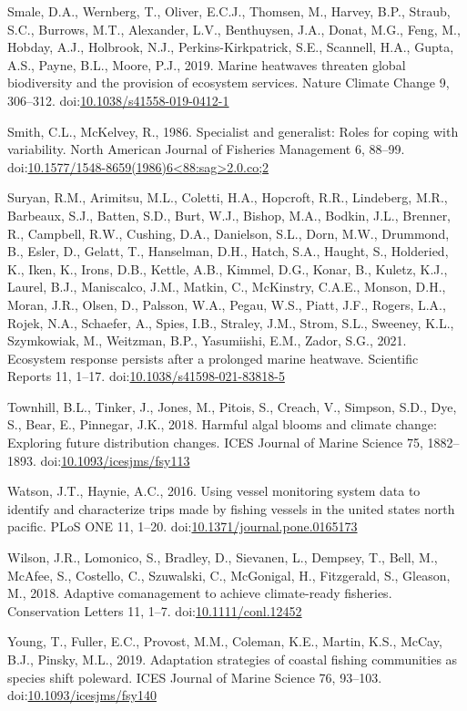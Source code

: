 \documentclass[]{elsarticle} %
\begin{document}
\leavevmode\hypertarget{ref-Smale2019}{}%
Smale, D.A., Wernberg, T., Oliver, E.C.J., Thomsen, M., Harvey, B.P.,
Straub, S.C., Burrows, M.T., Alexander, L.V., Benthuysen, J.A., Donat,
M.G., Feng, M., Hobday, A.J., Holbrook, N.J., Perkins-Kirkpatrick, S.E.,
Scannell, H.A., Gupta, A.S., Payne, B.L., Moore, P.J., 2019. Marine
heatwaves threaten global biodiversity and the provision of ecosystem
services. Nature Climate Change 9, 306--312.
doi:\href{https://doi.org/10.1038/s41558-019-0412-1}{10.1038/s41558-019-0412-1}

\leavevmode\hypertarget{ref-Smith1986}{}%
Smith, C.L., McKelvey, R., 1986. Specialist and generalist: Roles for
coping with variability. North American Journal of Fisheries Management
6, 88--99.
doi:\href{https://doi.org/10.1577/1548-8659(1986)6\%3C88:sag\%3E2.0.co;2}{10.1577/1548-8659(1986)6\textless88:sag\textgreater2.0.co;2}

\leavevmode\hypertarget{ref-Suryan2021}{}%
Suryan, R.M., Arimitsu, M.L., Coletti, H.A., Hopcroft, R.R., Lindeberg,
M.R., Barbeaux, S.J., Batten, S.D., Burt, W.J., Bishop, M.A., Bodkin,
J.L., Brenner, R., Campbell, R.W., Cushing, D.A., Danielson, S.L., Dorn,
M.W., Drummond, B., Esler, D., Gelatt, T., Hanselman, D.H., Hatch, S.A.,
Haught, S., Holderied, K., Iken, K., Irons, D.B., Kettle, A.B., Kimmel,
D.G., Konar, B., Kuletz, K.J., Laurel, B.J., Maniscalco, J.M., Matkin,
C., McKinstry, C.A.E., Monson, D.H., Moran, J.R., Olsen, D., Palsson,
W.A., Pegau, W.S., Piatt, J.F., Rogers, L.A., Rojek, N.A., Schaefer, A.,
Spies, I.B., Straley, J.M., Strom, S.L., Sweeney, K.L., Szymkowiak, M.,
Weitzman, B.P., Yasumiishi, E.M., Zador, S.G., 2021. Ecosystem response
persists after a prolonged marine heatwave. Scientific Reports 11,
1--17.
doi:\href{https://doi.org/10.1038/s41598-021-83818-5}{10.1038/s41598-021-83818-5}

\leavevmode\hypertarget{ref-Townhill2018}{}%
Townhill, B.L., Tinker, J., Jones, M., Pitois, S., Creach, V., Simpson,
S.D., Dye, S., Bear, E., Pinnegar, J.K., 2018. Harmful algal blooms and
climate change: Exploring future distribution changes. ICES Journal of
Marine Science 75, 1882--1893.
doi:\href{https://doi.org/10.1093/icesjms/fsy113}{10.1093/icesjms/fsy113}

\leavevmode\hypertarget{ref-Watson2016a}{}%
Watson, J.T., Haynie, A.C., 2016. Using vessel monitoring system data to
identify and characterize trips made by fishing vessels in the united
states north pacific. PLoS ONE 11, 1--20.
doi:\href{https://doi.org/10.1371/journal.pone.0165173}{10.1371/journal.pone.0165173}

\leavevmode\hypertarget{ref-Wilson2018}{}%
Wilson, J.R., Lomonico, S., Bradley, D., Sievanen, L., Dempsey, T.,
Bell, M., McAfee, S., Costello, C., Szuwalski, C., McGonigal, H.,
Fitzgerald, S., Gleason, M., 2018. Adaptive comanagement to achieve
climate-ready fisheries. Conservation Letters 11, 1--7.
doi:\href{https://doi.org/10.1111/conl.12452}{10.1111/conl.12452}

\leavevmode\hypertarget{ref-Young2019}{}%
Young, T., Fuller, E.C., Provost, M.M., Coleman, K.E., Martin, K.S.,
McCay, B.J., Pinsky, M.L., 2019. Adaptation strategies of coastal
fishing communities as species shift poleward. ICES Journal of Marine
Science 76, 93--103.
doi:\href{https://doi.org/10.1093/icesjms/fsy140}{10.1093/icesjms/fsy140}
\end{document}

